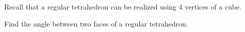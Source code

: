 Recall that a regular tetrahedron can be realized using 4 vertices of a cube.

Find the angle between two faces of a regular tetrahedron.


\begin{comment}Calculator code:
p0:=(1,1,1);
p1:=(-1,-1,1);
p2:=(1,-1,-1);
p3:=(-1,1,-1);
n1:=(p1-p0)\times (p2-p0);
n2:=(p3-p0)\times (p2-p0);

cosalpha:=(((n1 n2^t)_1)_1)  / (\sqrt{}( (((n1 n1^t)_1)_1 )*(((n2 n2^t)_1)_1))); 
\arccos (cosalpha)
\end{comment}